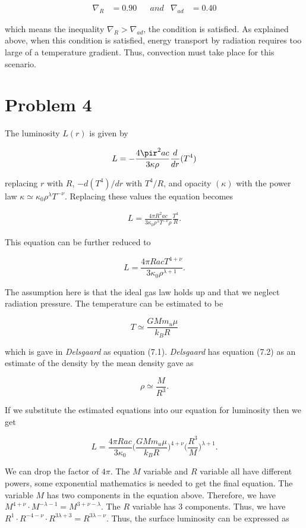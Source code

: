 \documentclass[11pt]{article}
\begin{document}
\begin{align*}
\nabla_{R} &= 0.90 && and & \nabla_{ad} &= 0.40
\end{align*}

which means the inequality $\nabla_{R} > \nabla_{ad}$, the condition is satisfied. As explained above, when this condition is satisfied, energy transport by radiation requires too large of a temperature gradient. Thus, convection must take place for this scenario.   

\clearpage

\section*{Problem 4}

The luminosity $L(r)$ is given by

$$
L = -\frac{4\pir^{2}ac}{3\kappa \rho} \frac{d}{dr} (T^{4})
$$

replacing $r$ with $R$, $-d(T^{4})/dr$ with $T^{4}/R$, and opacity $(\kappa)$ with the power law $\kappa \simeq \kappa_{0} \rho^{\lambda}T^{-\nu}$. Replacing these values the equation becomes

\begin{align*}
    L = \frac{4\pi R^{2}ac}{3\kappa_{0} \rho^{\lambda}T^{-\nu} \rho} \frac{T^{4}}{R}.
\end{align*}

This equation can be further reduced to

$$
    L = \frac{4\pi R a c T^{4+\nu}}{3\kappa_{0} \rho^{\lambda+1}}.
$$

The assumption here is that the ideal gas law holds up and that we neglect radiation pressure. The temperature can be estimated to be 

$$
T \simeq \frac{GMm_{u}\mu}{k_{B} R}
$$

which is gave in \textit{Delsgaard} as equation (7.1). \textit{Delsgaard} has equation (7.2) as an estimate of the density by the mean density gave as

$$
\rho \simeq \frac{M}{R^{3}}.
$$

If we substitute the estimated equations into our equation for luminosity then we get

$$
    L = \frac{4\pi R a c}{3\kappa_{0}} \Bigg(\frac{GMm_{u} \mu}{k_{B}R}\Bigg)^{4+\nu} \Bigg(\frac{R^{3}}{M}\Bigg)^{\lambda+1}.
$$
 
\newpage
 
We can drop the factor of $4\pi$. The $M$ variable and $R$ variable all have different powers, some exponential mathematics is needed to get the final equation. The variable $M$ has two components in the equation above. Therefore, we have $M^{4+\nu} \cdot M^{-\lambda - 1} = M^{3+\nu-\lambda}$. The $R$ variable has 3 components. Thus, we have $R^{1} \cdot R^{-4-\nu} \cdot R^{3\lambda + 3} = R^{3\lambda - \nu}$. Thus, the surface luminosity can be expressed as 
\end{document}
